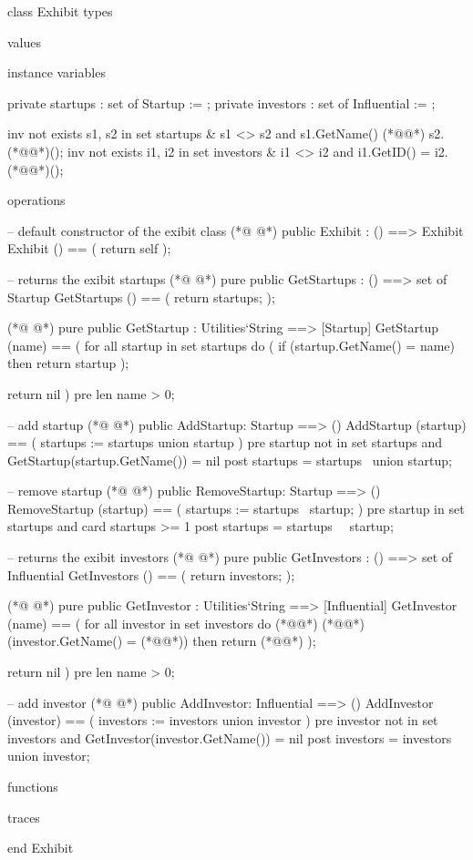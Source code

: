 \begin{vdmpp}[breaklines=true]
class Exhibit
types

values

instance variables

 private startups : set of Startup := {};
 private investors : set of Influential := {};
 
 inv not exists s1, s2 in set startups & s1 <> s2 and s1.GetName() (*@\vdmnotcovered{=}@*) s2.(*@@*)();
 inv not exists i1, i2 in set investors & i1 <> i2 and i1.GetID() = i2.(*@@*)();
 
operations

  -- default constructor of the exibit class 
(*@
\label{Exhibit:17}
@*)
 public Exhibit : () ==> Exhibit
  Exhibit () == (
    return self
   );
    
 -- returns the exibit startups
(*@
\label{GetStartups:23}
@*)
 pure public GetStartups : () ==> set of Startup
   GetStartups () == (
    return startups;
   );
   
(*@
\label{GetStartup:28}
@*)
  pure public GetStartup : Utilities`String ==> [Startup]
   GetStartup (name) == (
    for all startup in set startups do (
     if (startup.GetName() = name)
      then return startup
     );
     
     return nil
    )
    pre len name > 0; 
   
 -- add startup
(*@
\label{AddStartup:40}
@*)
 public AddStartup: Startup ==> ()
  AddStartup (startup) == (
    startups := startups union {startup}
   )
   pre startup not in set startups and GetStartup(startup.GetName()) = nil
   post startups = startups~ union {startup};  
 
 -- remove startup
(*@
\label{RemoveStartup:48}
@*)
 public RemoveStartup: Startup ==> ()
   RemoveStartup (startup) == (
    startups := startups \ {startup};
   )
   pre startup in set startups and card startups >= 1
  post startups = startups~ \ {startup};
 
 -- returns the exibit investors
(*@
\label{GetInvestors:56}
@*)
 pure public GetInvestors : () ==> set of Influential
  GetInvestors () == (
    return investors;
   );
 
(*@
\label{GetInvestor:61}
@*)
 pure public GetInvestor : Utilities`String ==> [Influential]
   GetInvestor (name) == (
    for all investor in set investors do (*@\vdmnotcovered{(}@*)
     (*@@*) (investor.GetName() = (*@@*))
      then return (*@@*)
     );
     
     return nil
    )
    pre len name > 0; 
 
 -- add investor
(*@
\label{AddInvestor:73}
@*)
 public AddInvestor: Influential ==> ()
  AddInvestor (investor) == (
    investors := investors union {investor}
   )
   pre investor not in set investors and GetInvestor(investor.GetName()) = nil
   post investors = investors~ union {investor};   
    
functions

traces

end Exhibit
\end{vdmpp}
